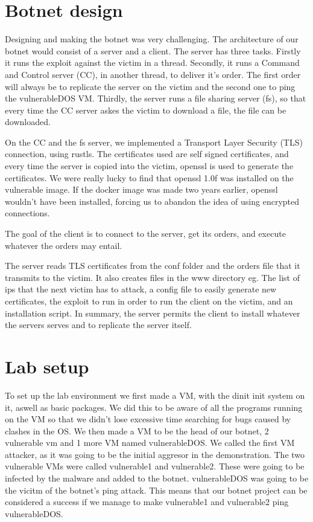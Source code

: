 \documentclass[../main.tex]{subfiles}
\begin{document}
    \vspace{10pt}

    \section{Botnet design}

    Designing and making the botnet was very challenging. 
    The architecture of our botnet would consist of a server and a client. The server has three tasks. 
    Firstly it runs the exploit against the victim in a thread.
    Secondly, it runs a Command and Control server (CC), in another thread, to deliver it's order.
    The first order will always be to replicate the server on the victim and the second one to ping the vulnerableDOS VM.
    Thirdly, the server runs a file sharing server (fs), so that every time the CC server askes the victim to download a file, the file can be downloaded.

    On the CC and the fs server, we implemented a Transport Layer Security (TLS) connection, using rustls. 
    The certificates used are self signed certificates, and every time the server is copied into the victim, openssl is used to generate the certificates.
    We were really lucky to find that openssl 1.0f was installed on the vulnerable image. 
    If the docker image was made two years earlier, openssl wouldn't have been installed, forcing us to abandon the idea of using encrypted connections.

    The goal of the client is to connect to the server, get its orders, and execute whatever the orders may entail.

    The server reads TLS certificates from the conf folder and the orders file that it transmits to the victim.
    It also creates files in the www directory eg. The list of ips that the next victim has to attack, a config file to easily generate new certificates, the exploit to run in order to run the client on the victim, and an installation script. In summary, the server permits the client to install whatever the servers serves and to replicate the server itself.

    \vspace{10pt}

    \section{Lab setup}

    To set up the lab environment we first made a VM, with the dinit init system on it, aswell as basic packages.
    We did this to be aware of all the programs running on the VM so that we didn't lose excessive time searching for bugs caused by clashes in the OS.
    We then made a VM to be the head of our botnet, 2 vulnerable vm and 1 more VM named vulnerableDOS.
    We called the first VM attacker, as it was going to be the initial aggresor in the demonstration.
    The two vulnerable VMs were called vulnerable1 and vulnerable2.
    These were going to be infected by the malware and added to the botnet.
    vulnerableDOS was going to be the vicitm of the botnet's ping attack.
    This means that our botnet project can be considered a success if we manage to make vulnerable1 and vulnerable2 ping vulnerableDOS.
\end{document}
